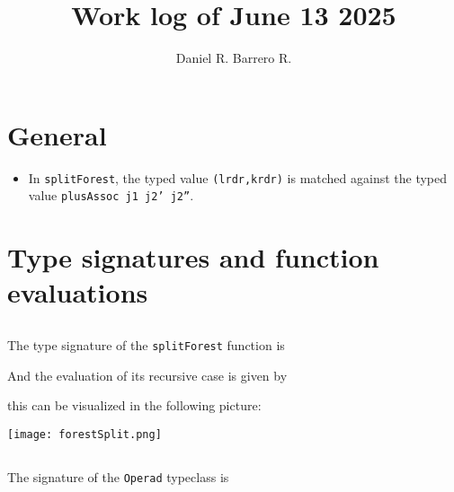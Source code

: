 \documentclass{amsart}
\title{Work log of June 13 2025}
\author{Daniel R. Barrero R.}
\begin{document}
\maketitle

\section{General}

\begin{itemize}
	\item In \texttt{splitForest}, the typed value \texttt{(lrdr,krdr)} is
		matched against the typed value \texttt{plusAssoc j1 j2' j2''}.
\end{itemize}

\newpage

\section{Type signatures and function evaluations}

\bigskip
\bigskip

\subsection{}

The type signature of the \texttt{splitForest} function is



\bigskip
\bigskip

And the evaluation of its recursive case is given by



\bigskip
\bigskip

this can be visualized in the following picture:

\bigskip
\bigskip

\texttt{[image: forestSplit.png]}

\newpage

\subsection{} 

The signature of the \texttt{Operad} typeclass is



\bigskip
\bigskip
\end{document}
